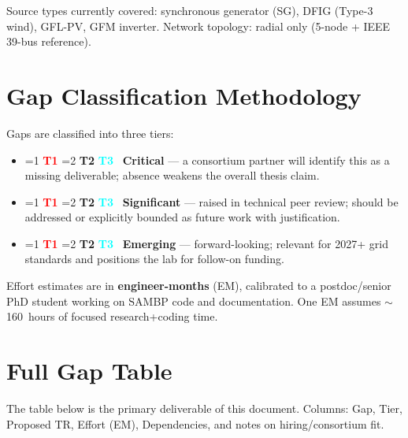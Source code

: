\documentclass[11pt, a4paper]{article}
\newcommand{\tier}[1]{%
  \ifnum#1=1
    \colorbox{red!15}{\textcolor{red}{\textbf{\footnotesize T1}}}%
  \else\ifnum#1=2
    \colorbox{amber!20}{\textcolor{amber}{\textbf{\footnotesize T2}}}%
  \else
    \colorbox{cyan!12}{\textcolor{cyan}{\textbf{\footnotesize T3}}}%
  \fi\fi
}
\begin{document}
Source types currently covered: synchronous generator (SG), DFIG (Type-3 wind),
GFL-PV, GFM inverter. Network topology: radial only (5-node + IEEE 39-bus reference).

\section{Gap Classification Methodology}

Gaps are classified into three tiers:

\begin{itemize}
  \item \tier{1}~\textbf{Critical} — a consortium partner will identify this as
        a missing deliverable; absence weakens the overall thesis claim.
  \item \tier{2}~\textbf{Significant} — raised in technical peer review; should
        be addressed or explicitly bounded as future work with justification.
  \item \tier{3}~\textbf{Emerging} — forward-looking; relevant for 2027+ grid
        standards and positions the lab for follow-on funding.
\end{itemize}

Effort estimates are in \textbf{engineer-months} (EM), calibrated to a
postdoc/senior PhD student working on SAMBP code and documentation.
One EM assumes $\sim$160~hours of focused research+coding time.

\section{Full Gap Table}
\label{sec:gaptable}

The table below is the primary deliverable of this document.
Columns: Gap, Tier, Proposed TR, Effort (EM), Dependencies, and
notes on hiring/consortium fit.

\vspace{4mm}

\begingroup
\small
\setlength{\tabcolsep}{5pt}
\renewcommand{\arraystretch}{1.45}
\end{document}
